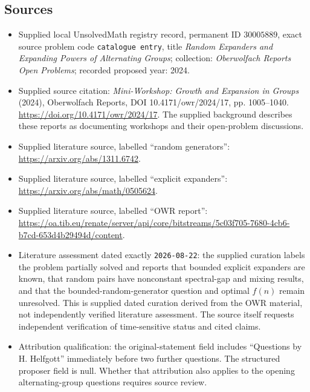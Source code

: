 \documentclass[11pt]{article}
\begin{document}
\subsection{Sources}
\begin{itemize}
\item Supplied local UnsolvedMath registry record, permanent ID \(30005889\), exact source problem code \texttt{catalogue entry}, title \emph{Random Expanders and Expanding Powers of Alternating Groups}; collection: \emph{Oberwolfach Reports Open Problems}; recorded proposed year: 2024.
\item Supplied source citation: \emph{Mini-Workshop: Growth and Expansion in Groups} (2024), Oberwolfach Reports, DOI 10.4171/owr/2024/17, pp. 1005--1040. \url{https://doi.org/10.4171/owr/2024/17}. The supplied background describes these reports as documenting workshops and their open-problem discussions.
\item Supplied literature source, labelled ``random generators'': \url{https://arxiv.org/abs/1311.6742}.
\item Supplied literature source, labelled ``explicit expanders'': \url{https://arxiv.org/abs/math/0505624}.
\item Supplied literature source, labelled ``OWR report'': \url{https://oa.tib.eu/renate/server/api/core/bitstreams/5c03f705-7680-4cb6-b7cd-653d4b29494d/content}.
\item Literature assessment dated exactly \texttt{2026-08-22}: the supplied curation labels the problem partially solved and reports that bounded explicit expanders are known, that random pairs have nonconstant spectral-gap and mixing results, and that the bounded-random-generator question and optimal \(f(n)\) remain unresolved. This is supplied dated curation derived from the OWR material, not independently verified literature assessment. The source itself requests independent verification of time-sensitive status and cited claims.
\item Attribution qualification: the original-statement field includes ``Questions by H. Helfgott'' immediately before two further questions. The structured proposer field is null. Whether that attribution also applies to the opening alternating-group questions requires source review.
\end{itemize}
\end{document}
